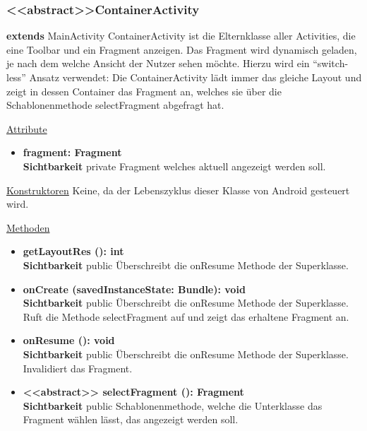 \subsubsection{<<abstract>>ContainerActivity}
\textbf{extends} MainActivity \newline
ContainerActivity ist die Elternklasse aller Activities, die eine Toolbar und ein Fragment anzeigen. Das Fragment wird dynamisch geladen, je nach dem welche Ansicht der Nutzer sehen möchte. Hierzu wird ein ``switch-less'' Ansatz verwendet: Die ContainerActivity lädt immer das gleiche Layout und zeigt in dessen Container das Fragment an, welches sie über die Schablonenmethode selectFragment abgefragt hat.
\newline

\underline{Attribute}
\begin{itemize}
\itemsep0pt
\item \textbf{fragment: Fragment} \hfill\\ 
\textbf{Sichtbarkeit} private\newline
Fragment welches aktuell angezeigt werden soll.

\end{itemize}

\underline{Konstruktoren}\newline
\indent Keine, da der Lebenszyklus dieser Klasse von Android gesteuert wird.\newline

\underline{Methoden}
\begin{itemize}
\itemsep0pt

\item \textbf{getLayoutRes (): int}\hfill\\
\textbf{Sichtbarkeit} public\newline
Überschreibt die onResume Methode der Superklasse.

\item \textbf{onCreate (savedInstanceState: Bundle): void}\hfill\\
\textbf{Sichtbarkeit} public\newline
Überschreibt die onResume Methode der Superklasse. Ruft die Methode selectFragment auf und zeigt das erhaltene Fragment an.

\item \textbf{onResume (): void}\hfill\\
\textbf{Sichtbarkeit} public\newline
Überschreibt die onResume Methode der Superklasse. Invalidiert das Fragment.

\label{app:containeractivity:methode:selectfragment} \item \textbf{<<abstract>> selectFragment (): Fragment} \hfill\\
\textbf{Sichtbarkeit} public\newline
Schablonenmethode, welche die Unterklasse das Fragment wählen lässt, das angezeigt werden soll.

\end{itemize}